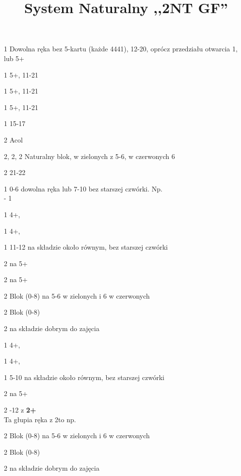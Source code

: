 \documentclass[12pt, a4paper]{article}
\title{\vspace{-2cm}System Naturalny ,,2NT GF''}
\date{}
\begin{document}
\maketitle

\begin{options}
	\item[1\clubs] Dowolna ręka bez 5-kartu (każde 4441), 12-20, oprócz przedziału otwarcia 1\nt, lub 5+\clubs
	\item[1\diams] 5+\diams, 11-21
	\item[1\hearts] 5+\hearts, 11-21
	\item[1\spades] 5+\spades, 11-21
	\item[1\nt] 15-17
	\item[2\clubs] Acol
	\item[2\diams, 2\hearts, 2\spades] Naturalny blok, w zielonych z 5-6, w czerwonych 6
	\item[2\nt] 21-22
\end{options}

\sequence{{1\clubs}}
\begin{options}[2]
	\item[1\diams] 0-6 dowolna ręka lub 7-10 bez starszej czwórki. Np. \\
					 - 1\diams {}\clubs
	\item[1\hearts] 4+\hearts, \fonce
	\item[1\spades] 4+\spades, \fonce
	\item[1\nt] 11-12 na składzie około równym, bez starszej czwórki \vimp
	\item[2\clubs] \gf na 5+\clubs
	\item[2\diams] \gf na 5+\diams
	\item[2\hearts] Blok (0-8) na 5-6 w zielonych i 6 w czerwonych 
	\item[2\spades] Blok (0-8)
	\item[2\nt] \gf na składzie dobrym do zajęcia \nt \imp
\end{options}

\sequence{{1\diams}}
\begin{options}[2]
	\item[1\hearts] 4+\hearts, \fonce
	\item[1\spades] 4+\spades, \fonce
	\item[1\nt] 5-10 na składzie około równym, bez starszej czwórki
	\item[2\clubs] \gf na 5+\clubs
	\item[2\diams] -12 z \textbf{2+}\diams \vimp \\
					Ta głupia ręka z 2\diams to np. 
	\item[2\hearts] Blok (0-8) na 5-6 w zielonych i 6 w czerwonych 
	\item[2\spades] Blok (0-8)
	\item[2\nt] \gf na składzie dobrym do zajęcia \nt \imp
\end{options}
\end{document}
